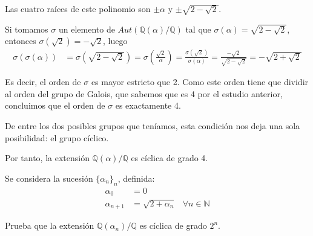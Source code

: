 \documentclass[a4paper, 11pt]{article}
\begin{document}
\begin{solucion}
      Las cuatro raíces de este polinomio son $\pm\alpha$ y $\pm\sqrt{2-\sqrt{2}}$.

      Si tomamos $\sigma$ un elemento de $Aut(\mathbb{Q}(\alpha)/\mathbb{Q})$ tal que $\sigma(\alpha) = \sqrt{2-\sqrt{2}}$, entonces $\sigma(\sqrt{2}) = -\sqrt{2}$, luego
      \begin{align*}
          \sigma(\sigma(\alpha)) &= \sigma(\sqrt{2-\sqrt{2}}) = \sigma\left(\frac{\sqrt{2}}{\alpha}\right) = \frac{\sigma(\sqrt{2})}{\sigma(\alpha)} = \frac{-\sqrt{2}}{\sqrt{2-\sqrt{2}}} = -\sqrt{2+\sqrt{2}}
      \end{align*}

      Es decir, el orden de $\sigma$ es mayor estricto que 2. Como este orden tiene que dividir al orden del grupo de Galois, que sabemos que es 4 por el estudio anterior, concluimos que el orden de $\sigma$ es exactamente 4.

      De entre los dos posibles grupos que teníamos, esta condición nos deja una sola posibilidad: el grupo cíclico.

      Por tanto, la extensión $\mathbb{Q}(\alpha)/\mathbb{Q}$ es cíclica de grado 4.

  \end{solucion}

  \begin{ejercicio}
      Se considera la sucesión $\{\alpha_n\}_n$, definida:
      \begin{align*}
          \alpha_0 &= 0 \\
          \alpha_{n+1} &=  \sqrt{2+\alpha_n} &\forall n\in\mathbb{N}
      \end{align*}

      Prueba que la extensión $\mathbb{Q}(\alpha_n)/\mathbb{Q}$ es cíclica de grado $2^n$.
  \end{ejercicio}
\end{document}
